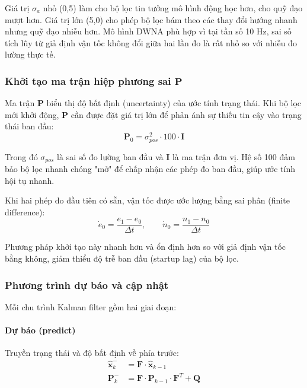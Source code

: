 Giá trị $\sigma_a$ nhỏ (0,5) làm cho bộ lọc tin tưởng mô hình động học hơn, cho quỹ đạo mượt hơn. Giá trị lớn (5,0) cho phép bộ lọc bám theo các thay đổi hướng nhanh nhưng quỹ đạo nhiễu hơn. Mô hình DWNA phù hợp vì tại tần số 10 Hz, sai số tích lũy từ giả định vận tốc không đổi giữa hai lần đo là rất nhỏ so với nhiễu đo lường thực tế.

\subsubsection{Khởi tạo ma trận hiệp phương sai \texorpdfstring{$\mathbf{P}$}{P}}

\hspace{0.5cm} Ma trận $\mathbf{P}$ biểu thị độ bất định (uncertainty) của ước tính trạng thái. Khi bộ lọc mới khởi động, $\mathbf{P}$ cần được đặt giá trị lớn để phản ánh sự thiếu tin cậy vào trạng thái ban đầu:
\begin{equation}
    \mathbf{P}_0 = \sigma_{pos}^2 \cdot 100 \cdot \mathbf{I}
\end{equation}

Trong đó $\sigma_{pos}$ là sai số đo lường ban đầu và $\mathbf{I}$ là ma trận đơn vị. Hệ số 100 đảm bảo bộ lọc nhanh chóng "mở" để chấp nhận các phép đo ban đầu, giúp ước tính hội tụ nhanh.

Khi hai phép đo đầu tiên có sẵn, vận tốc được ước lượng bằng sai phân (finite difference):
\begin{equation}
    \dot{e}_0 = \frac{e_1 - e_0}{\Delta t}, \qquad \dot{n}_0 = \frac{n_1 - n_0}{\Delta t}
\end{equation}

Phương pháp khởi tạo này nhanh hơn và ổn định hơn so với giả định vận tốc bằng không, giảm thiểu độ trễ ban đầu (startup lag) của bộ lọc.

\subsubsection{Phương trình dự báo và cập nhật}

\hspace{0.5cm} Mỗi chu trình Kalman filter gồm hai giai đoạn:

\paragraph{Dự báo (predict)\\} Truyền trạng thái và độ bất định về phía trước:
\begin{equation}
\begin{aligned}
    \hat{\mathbf{x}}_k^- &= \mathbf{F} \cdot \hat{\mathbf{x}}_{k-1} \\
    \mathbf{P}_k^- &= \mathbf{F} \cdot \mathbf{P}_{k-1} \cdot \mathbf{F}^T + \mathbf{Q}
\end{aligned}
\end{equation}

